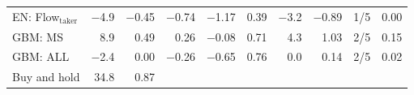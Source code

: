 \begin{tabular}{lrrrrrrrcr}
EN: Flow$_{\text{taker}}$ & \ensuremath{-}4.9 & \ensuremath{-}0.45 & \ensuremath{-}0.74 & \ensuremath{-}1.17 & 0.39 & \ensuremath{-}3.2 & \ensuremath{-}0.89 & 1/5 & 0.00\\
GBM: MS & 8.9 & 0.49 & 0.26 & \ensuremath{-}0.08 & 0.71 & 4.3 & 1.03 & 2/5 & 0.15\\
GBM: ALL & \ensuremath{-}2.4 & 0.00 & \ensuremath{-}0.26 & \ensuremath{-}0.65 & 0.76 & 0.0 & 0.14 & 2/5 & 0.02\\
\midrule
Buy and hold & 34.8 & 0.87 & & & & & & & \\
\bottomrule
\end{tabular}
